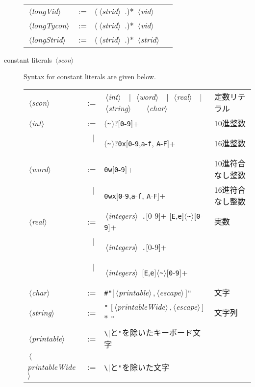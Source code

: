 \documentclass{jbook}
\newcommand{\txt}[2]{#2}
\newcommand{\vbar}{\mbox{\ $|$\ }}
\newcommand{\nonterm}[1]{\mbox{$\,\langle$}{\it #1}\mbox{$\rangle\,$}}
\newcommand{\term}[1]{\mbox{{\tt #1}}}
\newcommand{\optionalBegin}{\mbox{$($}}
\newcommand{\optionalEnd}{\mbox{$)?$}}
\begin{document}
\begin{description}
\begin{center}
\begin{tabular}{lcll}
\nonterm{longVid} &:=& (\nonterm{strid} .)* \nonterm{vid}\\
\nonterm{longTycon} &:=& (\nonterm{strid} .)* \nonterm{vid}\\
\nonterm{longStrid} &:=& (\nonterm{strid} .)* \nonterm{strid}\\
\end{tabular}
\end{center}


\item[\txt{定数リテラル \nonterm{scon}}{constant literals \nonterm{scon}}] 
\label{sec:lexicalItems:constants}
\txt{
定数リテラルの定義は以下の通りである．
}
{
Syntax for constant literals are given below.
}

\ifjp%
\begin{center}
\begin{tabular}{lcll}
\nonterm{scon} &:=& 
\nonterm{int} 
\vbar \nonterm{word} 
\vbar \nonterm{real} 
\vbar \nonterm{string} 
\vbar \nonterm{char}
&定数リテラル\\
\nonterm{int} &:=& 
\optionalBegin\verb|~|\optionalEnd[\term{0}-\term{9}]+ & 10進整数\\
&\vbar& \optionalBegin\verb|~|\optionalEnd\verb|0x|[\term{0}-\term{9},\term{a}-\term{f},%
\term{A}-\term{F}]+& 16進整数
\\[0.5ex]
\nonterm{word} &:=& \verb|0w|[\term{0}-\term{9}]+&10進符合なし整数
\\
&\vbar&\verb|0wx|[\term{0}-\term{9},\term{a}-\term{f},%
\term{A}-\term{F}]+& 16進符合なし整数
\\[0.5ex]
\nonterm{real}&:=& 
\nonterm{integers} \term{.}[0-9]+
[\term{E},\term{e}]$\langle$\verb|~|$\rangle$[\term{0}-\term{9}]+
&実数\\
&\vbar&\nonterm{integers} \term{.}[0-9]+ 
&\\
&\vbar&\nonterm{integers} 
[\term{E},\term{e}]$\langle$\verb|~|$\rangle$[\term{0}-\term{9}]+
&\\
\nonterm{char} &:=& \verb|#"|[\nonterm{printable},\nonterm{escape}]\verb|"|&文字\\
\nonterm{string} &:=& \verb|"| [\nonterm{printableWide},\nonterm{escape}]$*$ \verb|"|&文字列\\
\nonterm{printable} &:=& \verb|\|と\verb|"|を除いたキーボード文字\\
\nonterm{printableWide} &:=&\verb|\|と\verb|"|を除いた文字\\

\end{tabular}
\end{center}
\end{description}
\end{document}
